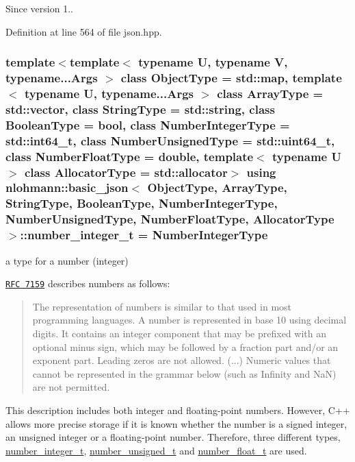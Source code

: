 \begin{DoxySince}{Since}
version 1.. 
\end{DoxySince}


Definition at line 564 of file json.\+hpp.

\hypertarget{classnlohmann_1_1basic__json_ac4b10b2364f26ce47bdb9a413ff04a59}{}
\subsubsection[{number\+\_\+integer\+\_\+t}]{\setlength{\rightskip}{0pt plus 5cm}template$<$template$<$ typename U, typename V, typename...\+Args $>$ class Object\+Type = std\+::map, template$<$ typename U, typename...\+Args $>$ class Array\+Type = std\+::vector, class String\+Type  = std\+::string, class Boolean\+Type  = bool, class Number\+Integer\+Type  = std\+::int64\+\_\+t, class Number\+Unsigned\+Type  = std\+::uint64\+\_\+t, class Number\+Float\+Type  = double, template$<$ typename U $>$ class Allocator\+Type = std\+::allocator$>$ using {\bf nlohmann\+::basic\+\_\+json}$<$ Object\+Type, Array\+Type, String\+Type, Boolean\+Type, Number\+Integer\+Type, Number\+Unsigned\+Type, Number\+Float\+Type, Allocator\+Type $>$\+::{\bf number\+\_\+integer\+\_\+t} =  Number\+Integer\+Type}\label{classnlohmann_1_1basic__json_ac4b10b2364f26ce47bdb9a413ff04a59}


a type for a number (integer) 

\href{http://rfc7159.net/rfc7159}{\tt R\+F\+C 7159} describes numbers as follows\+: \begin{quote}
The representation of numbers is similar to that used in most programming languages. A number is represented in base 10 using decimal digits. It contains an integer component that may be prefixed with an optional minus sign, which may be followed by a fraction part and/or an exponent part. Leading zeros are not allowed. (...) Numeric values that cannot be represented in the grammar below (such as Infinity and Na\+N) are not permitted. \end{quote}


This description includes both integer and floating-\/point numbers. However, C++ allows more precise storage if it is known whether the number is a signed integer, an unsigned integer or a floating-\/point number. Therefore, three different types, \hyperlink{classnlohmann_1_1basic__json_ac4b10b2364f26ce47bdb9a413ff04a59}{number\+\_\+integer\+\_\+t}, \hyperlink{classnlohmann_1_1basic__json_a60a04166c122072ab11eaf9845d9cd1d}{number\+\_\+unsigned\+\_\+t} and \hyperlink{classnlohmann_1_1basic__json_a74a0013e847fdc574b48f931f0e757e1}{number\+\_\+float\+\_\+t} are used.

